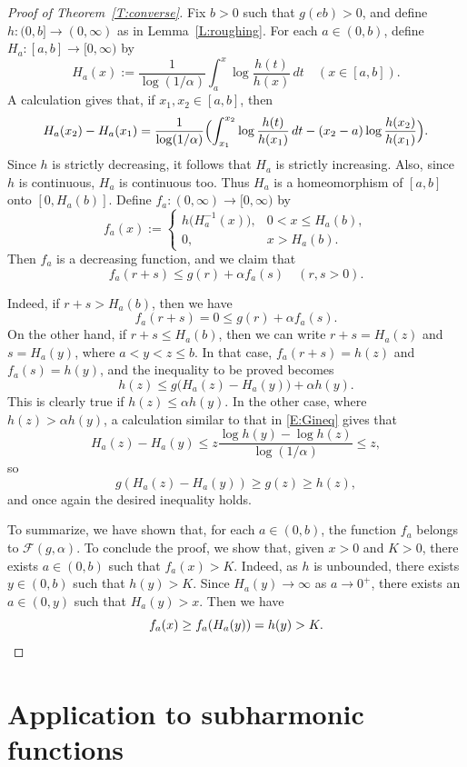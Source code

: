 \documentclass[11pt,reqno]{amsart}
\theoremstyle{plain}
\theoremstyle{definition}
\theoremstyle{remark}
\newcommand{\cF}{\mathcal{F}}
\begin{document}
\begin{proof}[Proof of Theorem~\ref{T:converse}]
Fix $b>0$ such that $g(eb)>0$,
and define $h:(0,b]\to(0,\infty)$ as in Lemma~\ref{L:roughing}.
For each $a\in(0,b)$, 
define $H_a:[a,b]\to[0,\infty)$
by
\[
H_a(x):=\frac{1}{\log (1/\alpha)}\int_a^x \log \frac{h(t)}{h(x)}\,dt \quad(x\in[a,b]).
\]
A calculation gives that, if $x_1,x_2\in[a,b]$, then
\[
H_a(x_2)-H_a(x_1)
=\frac{1}{\log(1/\alpha)}\Bigl(\int_{x_1}^{x_2} \log \frac{h(t)}{h(x_1)}\,dt
-(x_2-a)\log\frac{h(x_2)}{h(x_1)}\Bigr).
\]
Since $h$ is strictly decreasing, 
it follows that $H_a$ is strictly increasing.
Also, since $h$ is continuous, $H_a$ is continuous too.
Thus $H_a$
is a homeomorphism of $[a,b]$ onto $[0,H_a(b)]$.
Define $f_a:(0,\infty)\to[0,\infty)$ by
\[
f_a(x):=
\begin{cases}
h\bigl(H_a^{-1}(x)\bigr), &0<x\le H_a(b),\\
0, &x> H_a(b).
\end{cases}
\]
Then $f_a$ is a decreasing function, and we claim that
\[
f_a(r+s)\le g(r)+\alpha f_a(s) \quad(r,s>0).
\]

Indeed, if $r+s>H_a(b)$, then we have
\[
f_a(r+s)=0\le g(r)+\alpha f_a(s).
\]
On the other hand, if $r+s\le H_a(b)$,
then we can write 
$r+s=H_a(z)$ and
$s=H_a(y)$,
where $a<y<z\le b$. 
In that case, $f_a(r+s)=h(z)$
and $f_a(s)=h(y)$, and the inequality to be proved becomes
\[
h(z)\le g\bigl(H_a(z)-H_a(y)\bigr)+\alpha h(y).
\]
This is clearly true if $h(z)\le \alpha h(y)$. In the other case,
where $h(z)>\alpha h(y)$,
a calculation similar to that in \eqref{E:Gineq} gives that 
\[
H_a(z)-H_a(y)\le z\frac{\log h(y)-\log h(z)}{\log(1/\alpha)}\le z,
\]
so 
\[
g(H_a(z)-H_a(y))\ge g(z)\ge h(z),
\]
and once again the desired inequality holds.

To summarize, we have shown that, for each $a\in(0,b)$, 
the function $f_a$ belongs to $\cF(g,\alpha)$. To conclude the proof,
we show that, given $x>0$ and $K>0$,  there exists $a\in(0,b)$
such that $f_a(x)>K$.
Indeed, as $h$ is unbounded, there exists $y\in(0,b)$
such that $h(y)>K$. Since 
$H_a(y)\to\infty$ as $a\to0^+$,
there exists an $a\in(0,y)$ such that $H_a(y)>x$.
Then we have
\[
f_a(x)\ge f_a(H_a(y))=h(y)> K.\qedhere
\]
\end{proof}



\section{Application to subharmonic functions}\label{S:Domar}
\end{document}
